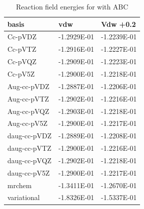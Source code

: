 \documentclass[../master_thesis.tex]{subfiles}
\begin{document}
\begin{table}[htbp]
\caption{Reaction field  energies for  with \ac{ABC}}
\begin{tabular}{|l|r|r|}
\hline
basis & \multicolumn{1}{l|}{vdw} & \multicolumn{1}{l|}{Vdw +0.2} \\ \hline
Cc-pVDZ & -1.2929E-01 & -1.2239E-01 \\ \hline
Cc-pVTZ & -1.2916E-01 & -1.2227E-01 \\ \hline
Cc-pVQZ & -1.2909E-01 & -1.2223E-01 \\ \hline
Cc-pV5Z & -1.2900E-01 & -1.2218E-01 \\ \hline
Aug-cc-pVDZ & -1.2887E-01 & -1.2206E-01 \\ \hline
Aug-cc-pVTZ & -1.2902E-01 & -1.2216E-01 \\ \hline
Aug-cc-pVQZ & -1.2903E-01 & -1.2218E-01 \\ \hline
Aug-cc-pV5Z & -1.2900E-01 & -1.2217E-01 \\ \hline
daug-cc-pVDZ & -1.2889E-01 & -1.2208E-01 \\ \hline
daug-cc-pVTZ & -1.2900E-01 & -1.2216E-01 \\ \hline
daug-cc-pVQZ & -1.2902E-01 & -1.2218E-01 \\ \hline
daug-cc-pV5Z & -1.2900E-01 & -1.2217E-01 \\ \hline
mrchem & -1.3411E-01 & -1.2670E-01 \\ \hline
variational & -1.8326E-01 & -1.5337E-01 \\ \hline
\end{tabular}
\label{tab:abcErnop}
\end{table}
\end{document}
